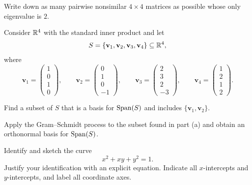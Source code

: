 \begin{problem}
Write down as many pairwise nonsimilar $4\times4$ matrices as possible whose only eigenvalue is $2$.
\end{problem}

\begin{problem}
Consider $\mathbb{R}^4$ with the standard inner product and let
\[
S=\{\mathbf v_1,\mathbf v_2,\mathbf v_3,\mathbf v_4\}\subseteq\mathbb{R}^4,
\]
where
\[
\mathbf v_1=
\begin{pmatrix}
1\\0\\1\\0
\end{pmatrix},
\qquad
\mathbf v_2=
\begin{pmatrix}
0\\1\\0\\-1
\end{pmatrix},
\qquad
\mathbf v_3=
\begin{pmatrix}
2\\3\\2\\-3
\end{pmatrix},
\qquad
\mathbf v_4=
\begin{pmatrix}
1\\2\\1\\2
\end{pmatrix}.
\]
\begin{problemsubparts}
\item Find a subset of $S$ that is a basis for $\operatorname{Span}(S)$ and includes $\{\mathbf v_1,\mathbf v_2\}$.
\item Apply the Gram--Schmidt process to the subset found in part \textup{(a)} and obtain an orthonormal basis for $\operatorname{Span}(S)$.
\end{problemsubparts}
\end{problem}

\begin{problem}
Identify and sketch the curve
\[
x^2+xy+y^2=1.
\]
Justify your identification with an explicit equation. Indicate all $x$-intercepts and $y$-intercepts, and label all coordinate axes.
\end{problem}

